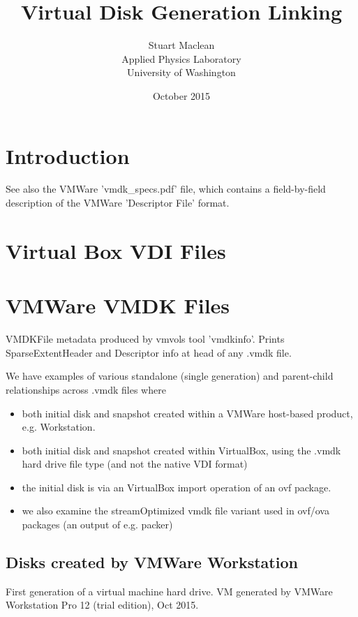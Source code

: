 \documentclass{article}
\title{Virtual Disk Generation Linking}
\author{Stuart Maclean \\
Applied Physics Laboratory \\
University of Washington}
\date{October 2015}
\begin{document}
\maketitle

\section{Introduction}

See also the VMWare 'vmdk\_specs.pdf' file, which contains a
field-by-field description of the VMWare 'Descriptor File' format.

\section{Virtual Box VDI Files}

\section{VMWare VMDK Files}

VMDKFile metadata produced by vmvols tool 'vmdkinfo'.  Prints
SparseExtentHeader and Descriptor info at head of any .vmdk file.

We have examples of various standalone (single generation) and
parent-child relationships across .vmdk files where

\begin{itemize}
\item both initial disk and snapshot
  created within a VMWare host-based product, e.g. Workstation.

\item both initial disk and snapshot
  created within VirtualBox, using the .vmdk hard drive file type (and
  not the native VDI format)

\item the initial disk is via an VirtualBox import operation of an ovf
  package.

\item we also examine the streamOptimized vmdk file variant used in
  ovf/ova packages (an output of e.g. packer)
\end{itemize}

\subsection{Disks created by VMWare Workstation}

First generation of a virtual machine hard drive. VM generated by
VMWare Workstation Pro 12 (trial edition), Oct 2015.
\end{document}
